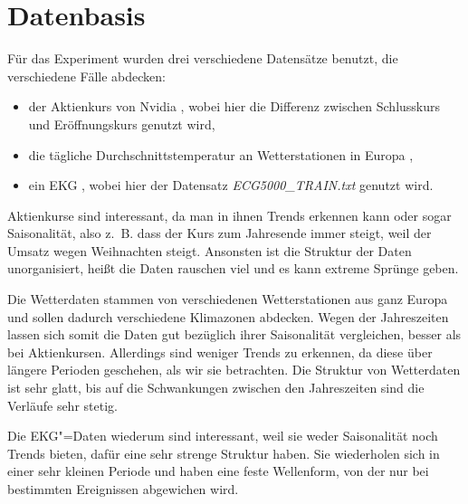 \section{Datenbasis}
Für das Experiment wurden drei verschiedene Datensätze benutzt, die verschiedene Fälle abdecken: 
\begin{itemize}
    \item der Aktienkurs von Nvidia \cite{nvidiaStock}, wobei hier die Differenz zwischen Schlusskurs und Eröffnungskurs genutzt wird,
    \item die tägliche Durchschnittstemperatur an Wetterstationen in Europa \cite{ecadWetterdaten},
    \item ein EKG \cite{ecg500}, wobei hier der Datensatz \textit{ECG5000\_TRAIN.txt} genutzt wird.
\end{itemize}

Aktienkurse sind interessant, da man in ihnen Trends erkennen kann oder sogar Saisonalität, also z.~B. dass der Kurs zum Jahresende immer steigt, weil der Umsatz wegen Weihnachten steigt. Ansonsten ist die Struktur der Daten unorganisiert, heißt die Daten rauschen viel und es kann extreme Sprünge geben.

Die Wetterdaten stammen von verschiedenen Wetterstationen aus ganz Europa und sollen dadurch verschiedene Klimazonen abdecken. Wegen der Jahreszeiten lassen sich somit die Daten gut bezüglich ihrer Saisonalität vergleichen, besser als bei Aktienkursen. Allerdings sind weniger Trends zu erkennen, da diese über längere Perioden geschehen, als wir sie betrachten. Die Struktur von Wetterdaten ist sehr glatt, bis auf die Schwankungen zwischen den Jahreszeiten sind die Verläufe sehr stetig.

Die EKG"=Daten wiederum sind interessant, weil sie weder Saisonalität noch Trends bieten, dafür eine sehr strenge Struktur haben. Sie wiederholen sich in einer sehr kleinen Periode und haben eine feste Wellenform, von der nur bei bestimmten Ereignissen abgewichen wird.
